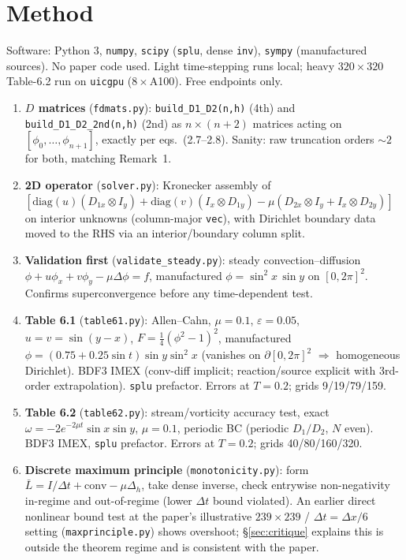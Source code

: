 \documentclass[11pt]{article}
\begin{document}
\section{Method}
Software: Python 3, \texttt{numpy}, \texttt{scipy} (\texttt{splu}, dense \texttt{inv}),
\texttt{sympy} (manufactured sources). No paper code used. Light time-stepping runs local; heavy
$320\times320$ Table-6.2 run on \texttt{uicgpu} ($8\times$A100). Free endpoints only.
\begin{enumerate}
  \item \textbf{$D$ matrices} (\texttt{fdmats.py}): \texttt{build\_D1\_D2(n,h)} (4th) and
    \texttt{build\_D1\_D2\_2nd(n,h)} (2nd) as $n\times(n{+}2)$ matrices acting on
    $[\phi_0,\ldots,\phi_{n+1}]$, exactly per eqs.~(2.7--2.8). Sanity: raw truncation orders
    $\sim 2$ for both, matching Remark~1.
  \item \textbf{2D operator} (\texttt{solver.py}): Kronecker assembly of
    $[\mathrm{diag}(u)(D_{1x}\otimes I_y) + \mathrm{diag}(v)(I_x\otimes D_{1y})
     - \mu(D_{2x}\otimes I_y + I_x\otimes D_{2y})]$ on interior unknowns (column-major
    \texttt{vec}), with Dirichlet boundary data moved to the RHS via an interior/boundary
    column split.
  \item \textbf{Validation first} (\texttt{validate\_steady.py}): steady convection--diffusion
    $\phi + u\phi_x + v\phi_y - \mu\Delta\phi = f$, manufactured
    $\phi=\sin^2 x\,\sin y$ on $[0,2\pi]^2$. Confirms superconvergence before any
    time-dependent test.
  \item \textbf{Table 6.1} (\texttt{table61.py}): Allen--Cahn, $\mu=0.1$, $\varepsilon=0.05$,
    $u=v=\sin(y-x)$, $F=\tfrac14(\phi^2-1)^2$, manufactured
    $\phi=(0.75+0.25\sin t)\sin y\sin^2 x$ (vanishes on $\partial[0,2\pi]^2$
    $\Rightarrow$ homogeneous Dirichlet). BDF3 IMEX (conv-diff implicit; reaction/source
    explicit with 3rd-order extrapolation). \texttt{splu} prefactor. Errors at $T=0.2$;
    grids 9/19/79/159.
  \item \textbf{Table 6.2} (\texttt{table62.py}): stream/vorticity accuracy test, exact
    $\omega = -2e^{-2\mu t}\sin x \sin y$, $\mu=0.1$, periodic BC (periodic $D_1/D_2$, $N$
    even). BDF3 IMEX, \texttt{splu} prefactor. Errors at $T=0.2$; grids 40/80/160/320.
  \item \textbf{Discrete maximum principle} (\texttt{monotonicity.py}): form
    $\bar L = I/\Delta t + \mathrm{conv} - \mu\Delta_h$, take dense inverse, check entrywise
    non-negativity in-regime and out-of-regime (lower $\Delta t$ bound violated). An earlier
    direct nonlinear bound test at the paper's illustrative $239\times239$ / $\Delta t=\Delta x/6$
    setting (\texttt{maxprinciple.py}) shows overshoot; \S\ref{sec:critique} explains this is
    outside the theorem regime and is consistent with the paper.
\end{enumerate}
\end{document}
